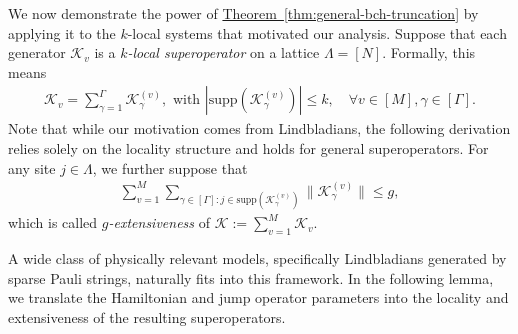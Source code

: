 \documentclass[aps,pra,reprint,groupedaddress,floatfix]{revtex4-2}
\newcommand{\thm}[1]{\hyperref[thm:#1]{Theorem~\ref*{thm:#1}}}
\newcommand{\supp}{\mathrm{supp}}
\newcommand{\mc}{\mathcal}
\begin{document}
We now demonstrate the power of \thm{general-bch-truncation} by applying it to the $k$-local systems that motivated our analysis. Suppose that each generator $\mc K_v$ is a \emph{$k$-local superoperator} on a lattice $\Lambda = [N]$. Formally, this means
\begin{align*}
    \mc K_v = \sum_{\gamma = 1}^{\Gamma} \mc K_{\gamma}^{(v)}, \text{ with } |\supp(\mc K_{\gamma}^{(v)} )|\le k, \quad \forall v\in [M], \gamma\in [\Gamma].
\end{align*} 
Note that while our motivation comes from Lindbladians, the following derivation relies solely on the locality structure and holds for general superoperators.
For any site $j\in \Lambda$, we further suppose that 
\begin{align*}
    \sum_{v=1}^M\sum_{\gamma\in [\Gamma]: j\in \supp(\mc K_{\gamma}^{(v)})}\|\mc K_\gamma^{(v)}\|\le g,
\end{align*}
which is called \emph{$g$-extensiveness} of $\mc K:= \sum_{v=1}^M \mc K_v$.

A wide class of physically relevant models, specifically Lindbladians generated by sparse Pauli strings, naturally fits into this framework. In the following lemma, we translate the Hamiltonian and jump operator parameters into the locality and extensiveness of the resulting superoperators.
\end{document}
